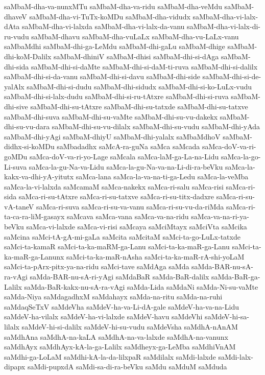 {saMbaM-dha-va-nunxMTu
saMbaM-dha-va-ridu
saMbaM-dha-veMdu
saMbaM-dhaveV
saMbaM-dha-vi-TuTx-koMDu
saMbaM-dha-vidudx
saMbaM-dha-vi-lalx-dAta
saMbaM-dha-vi-lalxda
saMbaM-dha-vi-lalx-da-vanu
saMbaM-dha-vi-lalx-di-ru-vudu
saMbaM-dhavu
saMbaM-dha-vuLaLx
saMbaM-dha-vu-LaLx-vanu
saMbaMdhi
saMbaM-dhi-ga-LeMdu
saMbaM-dhi-gaLu
saMbaM-dhige
saMbaM-dhi-koM-Dalilx
saMbaM-dhiniV
saMbaM-dhisi
saMbaM-dhi-si-dAga
saMbaM-dhi-sida
saMbaM-dhi-si-daMte
saMbaM-dhi-si-daM-ti-ruva
saMbaM-dhi-si-dalilx
saMbaM-dhi-si-da-vanu
saMbaM-dhi-si-davu
saMbaM-dhi-side
saMbaM-dhi-si-de-yalAlx
saMbaM-dhi-si-dudu
saMbaM-dhi-sidudx
saMbaM-dhi-si-ko-LuLx-vudu
saMbaM-dhi-si-lalx-dudu
saMbaM-dhi-si-ru-tAtxre
saMbaM-dhi-si-ruva
saMbaM-dhi-sive
saMbaM-dhi-su-tAtxre
saMbaM-dhi-su-tatxde
saMbaM-dhi-su-tatxve
saMbaM-dhi-suva
saMbaM-dhi-su-vaMte
saMbaM-dhi-su-vu-dakekx
saMbaM-dhi-su-vu-dara
saMbaM-dhi-su-vu-dilalx
saMbaM-dhi-su-vudu
saMbaM-dhi-yAda
saMbaM-dhi-yAgi
saMbaM-dhiyU
saMbaM-dhi-yalalx
saMbaMdhoV
saMbaM-didhx-si-koMDu
saMbadadhx
saMcA-ra-guNa
saMca
saMcada
saMca-doV-va-ri-goMDu
saMca-doV-va-ri-yo-Lage
saMcala
saMca-laM-ga-La-na-Lidu
saMca-la-go-Li-suva
saMca-la-gu-Na-va-Lidu
saMca-la-gu-Na-va-na-Li-di-ra-beVku
saMca-la-kakx-va-dhi-yA-yitutx
saMca-lana
saMca-la-va-na-ti-ga-Ledu
saMca-la-veMba
saMca-la-vi-lalxda
saMcamaM
saMca-nakekx
saMca-ri-salu
saMca-risi
saMca-ri-sida
saMca-ri-su-tAtxre
saMca-ri-su-tatxve
saMca-ri-su-titx-dadxre
saMca-ri-su-vA-taneV
saMca-ri-suva
saMca-ri-su-va-vanu
saMca-ri-su-vu-da-riMda
saMca-ri-ta-ca-ra-liM-gasayx
saMcava
saMca-vana
saMca-va-na-ridu
saMca-va-na-ri-ya-beVku
saMca-vi-lalxde
saMca-vi-risi
saMcaya
saMciMtayx
saMciVta
saMcika
saMcina
saMci-tA-gA-mi-gaLa
saMcita
saMcitaM
saMci-ta-go-LuLx-tatxde
saMci-ta-kamaR
saMci-ta-ka-maRM-ga-Lanu
saMci-ta-ka-maR-ga-Lanu
saMci-ta-ka-maR-ga-Lanunx
saMci-ta-ka-maR-nAsha
saMci-ta-ka-maR-rA-shi-yoLaM
saMci-ta-pArx-pitx-ya-na-ridu
saMci-tave
saMdAga
saMda
saMda-BAR-nu-sA-ra-vAgi
saMda-BAR-nu-sA-ri-yAgi
saMdaBaR
saMda-BaR-dalilx
saMda-BaR-ga-Lalilx
saMda-BaR-kakx-nu-sA-ra-vAgi
saMda-Lida
saMdaNi
saMda-Ni-su-vaMte
saMda-Niya
saMdagadhxM
saMdahayx
saMda-na-ritu
saMda-na-ruhi
saMdaqSeTxV
saMdeVha
saMdeV-ha-va-Li-dA-gale
saMdeV-ha-va-na-Lidu
saMdeV-ha-vilalx
saMdeV-ha-vi-lalxde
saMdeV-havu
saMdeVhi
saMdeV-hi-sa-lilalx
saMdeV-hi-si-dalilx
saMdeV-hi-su-vudu
saMdeVsha
saMdhA-nAnAM
saMdhAna
saMdhA-na-kaLA
saMdhA-na-va-lalxde
saMdhA-na-vanunx
saMdhAyx
saMdhAyx-kA-la-ga-Lalilx
saMdheyx-ga-LeMba
saMdhiVnAM
saMdhi-ga-LoLaM
saMdhi-kA-la-da-lilxpaR
saMdilalx
saMdi-lalxde
saMdi-lalx-dipapx
saMdi-pupxdA
saMdi-sa-di-ra-beVku
saMdu
saMduM
saMduda
}
